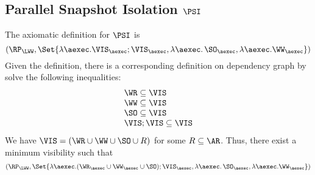 \subsection{Parallel Snapshot Isolation \(\PSI\)}
\label{sec:sound-complete-psi}

The axiomatic definition for \( \PSI \) is 
\[ 
    (\RP_{\LWW}, \Set{\lambda \aexec. \VIS_{\aexec} ; \VIS_{\aexec}, \lambda \aexec \ldotp \SO_\aexec, \lambda \aexec. \WW_\aexec })
\]
Given the definition, there is a corresponding definition on dependency graph by solve the following inequalities:
\[
    \begin{array}{@{}l@{}}
        \WR \subseteq \VIS \\
        \WW \subseteq \VIS \\
        \SO \subseteq \VIS \\
        \VIS ; \VIS \subseteq \VIS 
    \end{array}
\]
We have \( \VIS = (\WR \cup \WW \cup \SO \cup R) \) for some \( R \subseteq \AR \).
Thus, there exist a minimum visibility such that 
\[ 
    (\RP_{\LWW}, \Set{\lambda \aexec. (\WR_{\aexec} \cup \WW_{\aexec} \cup \SO ) ; \VIS_{\aexec}, \lambda \aexec \ldotp \SO_\aexec, \lambda \aexec. \WW_\aexec })
\]

